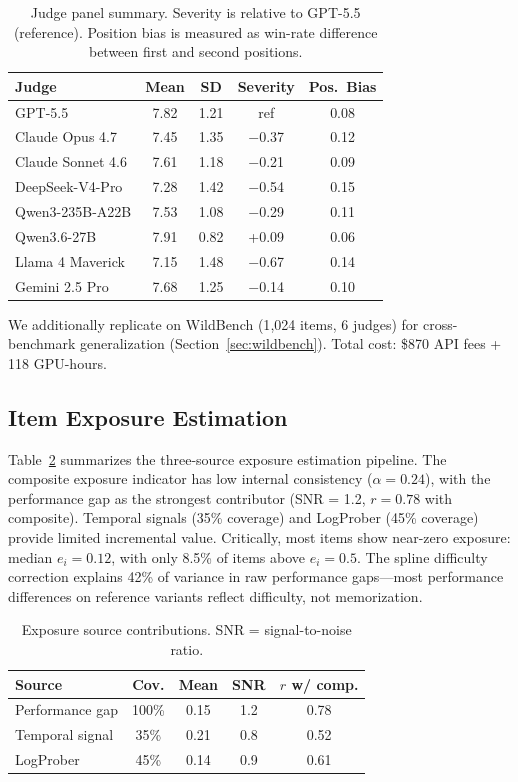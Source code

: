\documentclass[11pt]{article}
\begin{document}
\begin{table}[t]
\centering
\small
\caption{Judge panel summary. Severity is relative to GPT-5.5 (reference). Position bias is measured as win-rate difference between first and second positions.}
\label{tab:judges}
\begin{tabular}{lcccc}
\toprule
\textbf{Judge} & \textbf{Mean} & \textbf{SD} & \textbf{Severity} & \textbf{Pos.\ Bias} \\
\midrule
GPT-5.5 & 7.82 & 1.21 & ref & 0.08 \\
Claude Opus 4.7 & 7.45 & 1.35 & $-$0.37 & 0.12 \\
Claude Sonnet 4.6 & 7.61 & 1.18 & $-$0.21 & 0.09 \\
DeepSeek-V4-Pro & 7.28 & 1.42 & $-$0.54 & 0.15 \\
Qwen3-235B-A22B & 7.53 & 1.08 & $-$0.29 & 0.11 \\
Qwen3.6-27B & 7.91 & 0.82 & +0.09 & 0.06 \\
Llama 4 Maverick & 7.15 & 1.48 & $-$0.67 & 0.14 \\
Gemini 2.5 Pro & 7.68 & 1.25 & $-$0.14 & 0.10 \\
\bottomrule
\end{tabular}
\end{table}

We additionally replicate on WildBench (1{,}024 items, 6 judges) for cross-benchmark generalization (Section~\ref{sec:wildbench}).
Total cost: \$870 API fees + 118 GPU-hours.

\subsection{Item Exposure Estimation}
\label{sec:exposure}

Table~\ref{tab:exposure} summarizes the three-source exposure estimation pipeline.
The composite exposure indicator has low internal consistency ($\alpha = 0.24$), with the performance gap as the strongest contributor (SNR = 1.2, $r = 0.78$ with composite).
Temporal signals (35\% coverage) and LogProber (45\% coverage) provide limited incremental value.
Critically, most items show near-zero exposure: median $e_i = 0.12$, with only 8.5\% of items above $e_i = 0.5$.
The spline difficulty correction explains 42\% of variance in raw performance gaps---most performance differences on reference variants reflect difficulty, not memorization.

\begin{table}[t]
\centering
\small
\caption{Exposure source contributions. SNR = signal-to-noise ratio.}
\label{tab:exposure}
\begin{tabular}{lcccc}
\toprule
\textbf{Source} & \textbf{Cov.} & \textbf{Mean} & \textbf{SNR} & \textbf{$r$ w/ comp.} \\
\midrule
Performance gap & 100\% & 0.15 & 1.2 & 0.78 \\
Temporal signal & 35\% & 0.21 & 0.8 & 0.52 \\
LogProber & 45\% & 0.14 & 0.9 & 0.61 \\
\bottomrule
\end{tabular}
\end{table}
\end{document}
